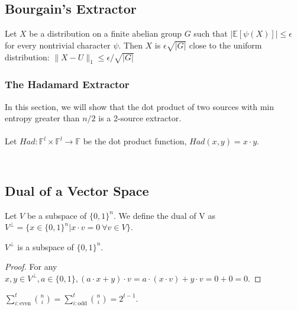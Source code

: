 \section{Bourgain's Extractor}
\begin{lemma}
Let $X$ be a distribution on a finite abelian group $G$ such that $|\mathbb{E}[\psi (X)] | \leq \epsilon$ for every nontrivial character $\psi$. Then $X$ is $\epsilon \sqrt{|G|}$ close to the uniform distribution: $\| X - U \|_1 \leq \epsilon / \sqrt{|G|}$
\end{lemma}
\subsection{The Hadamard Extractor}
In this section, we will show that the dot product of two sources with min entropy greater than $n/2$ is a 2-source extractor. \\ \\
Let $Had: \mathbb{F}^l \times \mathbb{F}^l \rightarrow \mathbb{F}$ be the dot product function, $Had(x,y) = x \cdot y$. \\ \\


\appendix

\chapter{}
\section{Dual of a Vector Space}
\begin{definition} 
Let $V$ be a subspace of $\{0,1\}^n$. 
We define the dual of V as 
$V^\perp = \{ x \in \{ 0,1 \}^n | x \cdot v = 0 \ \forall v \in V \}$.
\end{definition}

\begin{theorem}
$V^\perp$ is a subspace of $\{ 0,1 \}^n$.
\end{theorem}

\begin{proof}
For any $x, y \in V^\perp, a \in \{0,1\}, (a \cdot x+y)\cdot v = a \cdot (x \cdot v) + y \cdot v = 0 + 0 = 0$. 
\end{proof} 

\begin{lemma} $\sum \limits_{i: \text{even}}^t {n \choose i} = 
\sum \limits_{i: \text{odd}}^t {n \choose i} = 2^{t-1} $.
\end{lemma}

